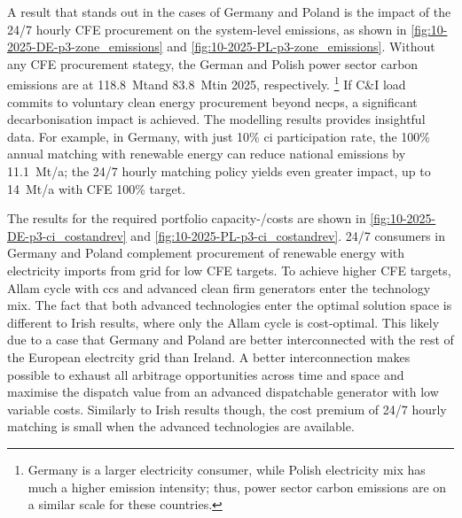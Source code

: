 A result that stands out in the cases of Germany and Poland is the impact of the 24/7 hourly CFE procurement on the system-level \co emissions, as shown in \cref{fig:10-2025-DE-p3-zone_emissions} and \cref{fig:10-2025-PL-p3-zone_emissions}.
Without any CFE procurement stategy, the German and Polish power sector carbon emissions are at 118.8~Mt\co and 83.8~Mt\co in 2025, respectively.%
\footnote{Germany is a larger electricity consumer, while Polish electricity mix has much a higher emission intensity; thus, power sector carbon emissions are on a similar scale for these countries.} 
If C\&I load commits to voluntary clean energy procurement beyond \gls{necp}s, a significant decarbonisation impact is achieved. 
The modelling results provides insightful data.
For example, in Germany, with just 10\% \gls{ci} participation rate, the 100\% annual matching with renewable energy can reduce national emissions by 11.1~Mt\co/a; the 24/7 hourly matching policy yields even greater impact, up to 14~Mt\co/a with CFE 100\% target.

The results for the required portfolio capacity-/costs are shown in \cref{fig:10-2025-DE-p3-ci_costandrev} and \cref{fig:10-2025-PL-p3-ci_costandrev}.
24/7 consumers in Germany and Poland complement procurement of renewable energy with electricity imports from grid for low CFE targets. 
To achieve higher CFE targets, Allam cycle with \gls{ccs} and advanced clean firm generators enter the technology mix. 
The fact that both advanced technologies enter the optimal solution space is different to Irish results, where only the Allam cycle is cost-optimal. 
This likely due to a case that Germany and Poland are better interconnected with the rest of the European electrcity grid than Ireland. 
A better interconnection makes possible to exhaust all arbitrage opportunities across time and space and maximise the dispatch value from an advanced dispatchable generator with low variable costs.
Similarly to Irish results though, the cost premium of 24/7 hourly matching is small when the advanced technologies are available.  

